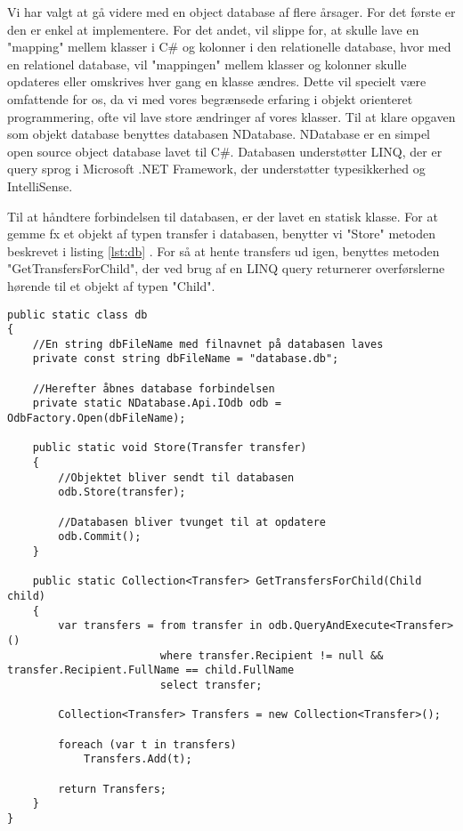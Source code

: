 Vi har valgt at gå videre med en object database af flere årsager. For det første er den er enkel at implementere. For det andet, vil slippe for, at skulle lave en "mapping" mellem klasser i C\# og kolonner i den relationelle database, hvor med en relationel database, vil "mappingen" mellem klasser og kolonner skulle opdateres eller omskrives hver gang en klasse ændres. Dette vil specielt være omfattende for os, da vi med vores begrænsede erfaring i objekt orienteret programmering, ofte vil lave store ændringer af vores klasser.
Til at klare opgaven som objekt database benyttes databasen NDatabase. NDatabase er en simpel open source object database lavet til C\#. Databasen understøtter LINQ, der er query sprog i Microsoft .NET Framework, der understøtter typesikkerhed og IntelliSense\cite{linqdok}.

Til at håndtere forbindelsen til databasen, er der lavet en statisk klasse. For at gemme fx et objekt af typen transfer i databasen, benytter vi "Store" metoden beskrevet i listing \ref{lst:db} . For så at hente transfers ud igen, benyttes metoden "GetTransfersForChild", der ved brug af en LINQ query returnerer overførslerne hørende til et objekt af typen "Child".
\\

\begin{lstlisting}[caption={Uddrag af filen "db.cs" fra kildekoden til programmet},label={lst:db}]
public static class db
{
	//En string dbFileName med filnavnet på databasen laves
	private const string dbFileName = "database.db";
	
	//Herefter åbnes database forbindelsen
	private static NDatabase.Api.IOdb odb = OdbFactory.Open(dbFileName);

	public static void Store(Transfer transfer)
	{
		//Objektet bliver sendt til databasen
		odb.Store(transfer);
		
		//Databasen bliver tvunget til at opdatere
		odb.Commit();
	}
	
	public static Collection<Transfer> GetTransfersForChild(Child child)
	{
		var transfers = from transfer in odb.QueryAndExecute<Transfer>()
						where transfer.Recipient != null && transfer.Recipient.FullName == child.FullName
						select transfer;

		Collection<Transfer> Transfers = new Collection<Transfer>();

		foreach (var t in transfers)
			Transfers.Add(t);

		return Transfers;
	}
}
\end{lstlisting}